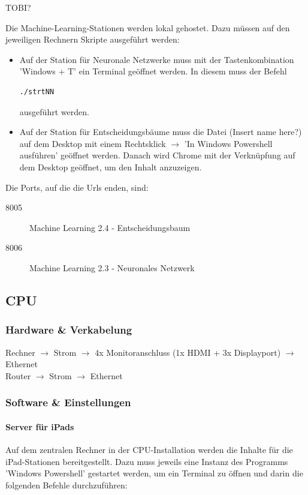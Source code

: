 \documentclass [titlepage,a4paper]{article}
\begin{document}
TOBI?

Die Machine-Learning-Stationen werden lokal gehostet. Dazu müssen auf den jeweiligen Rechnern Skripte ausgeführt werden:

\begin{itemize}
\item Auf der Station für Neuronale Netzwerke muss mit der Tastenkombination 'Windows + T' ein Terminal geöffnet werden. In diesem muss der Befehl \begin{verbatim}
./strtNN
\end{verbatim} ausgeführt werden.
\item Auf der Station für Entscheidungsbäume muss die Datei (Insert name here?) auf dem Desktop mit einem Rechtsklick $\rightarrow$ 'In Windows Powershell ausführen' geöffnet werden. Danach wird Chrome mit der Verknüpfung auf dem Desktop geöffnet, um den Inhalt anzuzeigen.
\end{itemize}

Die Ports, auf die die Urls enden, sind: \begin{description}
    \item[8005] Machine Learning 2.4 - Entscheidungsbaum
    \item[8006] Machine Learning 2.3 - Neuronales Netzwerk
\end{description}

\subsection{CPU}

\subsubsection{Hardware \& Verkabelung}

Rechner $\rightarrow$ Strom
        $\rightarrow$ 4x Monitoranschluss (1x HDMI + 3x Displayport)
        $\rightarrow$ Ethernet\\
Router $\rightarrow$ Strom
       $\rightarrow$ Ethernet

\subsubsection{Software \& Einstellungen}

\paragraph{Server für iPads}
Auf dem zentralen Rechner in der CPU-Installation werden die Inhalte für die iPad-Stationen bereitgestellt. Dazu muss jeweils eine Instanz des Programms 'Windows Powershell' gestartet werden, um ein Terminal zu öffnen und darin die folgenden Befehle durchzuführen:
\end{document}
